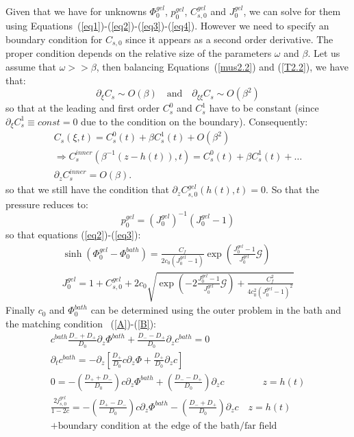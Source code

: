 \documentclass[12pt]{extarticle}
\begin{document}
Given that we have for unknowns $\Phi^{gel}_0$, $p^{gel}_0$, $C^{gel}_{s,0}$ and $J^{gel}_0$, we can solve for them using Equations~(\ref{eq1})-(\ref{eq2})-(\ref{eq3})-(\ref{eq4}). However we need to specify an boundary condition for $C_{s,0}$ since it appears as a second order derivative. The proper condition depends on the relative size of the parameters $\omega$ and $\beta$. Let us assume that $\omega>>\beta$, then balancing Equations~(\ref{mus2.2}) and (\ref{T2.2}), we have that:
\begin{equation}
\partial_{\xi}C_s\sim O(\beta) \quad \text{and}\quad \partial_{\xi\xi}C_s\sim O(\beta^2)
\end{equation}
so that at the leading and first order $C^0_s$ and $C^1_s$ have to be constant (since $\partial_\xi C^1_s\equiv const = 0$ due to the condition on the boundary). Consequently:
\begin{equation}
\begin{aligned}
C_s(\xi,t)= C^0_s(t) + \beta C_s^1(t)+ O(\beta^2) \\
\Rightarrow C^{inner}_s(\beta^{-1}(z-h(t)),t) = C^0_s(t) + \beta C^1_s(t) + \ldots\\
\partial_z C^{inner}_s = O(\beta). 
\end{aligned}
\end{equation}
so that we still have the condition that $\partial_z C^{gel}_{s,0}(h(t),t)=0$.
So that the pressure reduces to:
\begin{equation}
p^{gel}_0 = (J^{gel}_0)^{-1}\left(J^{gel}_0-1\right)
\end{equation}
so that equations (\ref{eq2})-(\ref{eq3}):
\begin{gather}
\sinh(\Phi_0^{gel}-\Phi_0^{bath})= \frac{C_f}{2c_0 (J_0^{gel}-1)}\exp\left(\frac{J^{gel}_0-1}{J^{gel}_0}\mathcal{G}\right)\\
J^{gel}_0=1+C^{gel}_{s,0}+ 2c_0\sqrt{\exp\left(-2\frac{J^{gel}_0-1}{J^{gel}_0}\mathcal{G}\right)+\frac{C^2_f}{4c^2_0 (J_0^{gel}-1)^2}}
\end{gather}
Finally $c_0$ and $\Phi^{bath}_0$ can be determined using the outer problem in the bath and the matching condition ~(\ref{A})-(\ref{B}):
\begin{gather}
c^{bath} \frac{D_-+D_+}{D_0} \partial_z \Phi^{bath} + \frac{D_--D_+}{D_0} \partial_z c^{bath}=0\\
\partial_t c^{bath} = -\partial_z\left[\frac{D_+}{D_0} c \partial_z \Phi +\frac{D_+}{D_0} \partial_z c\right]\\
0= - \left(\frac{D_++D_-}{D_0}\right)c\partial_z \Phi^{bath} + \left(\frac{D_--D_+}{D_0}\right)\partial_z c \qquad \qquad z=h(t)\\
\frac{2j_{s,0}^{gel}}{1-2c} =- \left(\frac{D_+-D_-}{D_0}\right)c\partial_z \Phi^{bath} - \left(\frac{D_-+D_+}{D_0}\right)\partial_z c \quad z=h(t)\\
+ \text{boundary condition at the edge of the bath/far field}
\end{gather}
\end{document}
